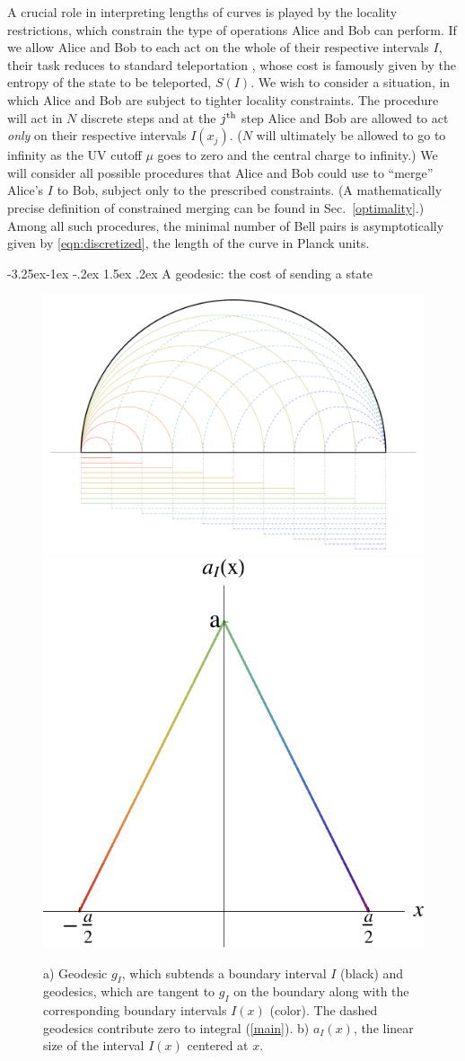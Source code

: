 \documentclass[12pt]{article}
\makeatletter
\renewcommand\subsection{\@startsection{subsection}{2}{\z@}%
                                     {-3.25ex\@plus -1ex \@minus -.2ex}%
                                     {1.5ex \@plus .2ex}%
                                     {\normalfont\bfseries}}
\newcommand{\secref}[1]{Sec.~\ref{#1}}
\makeatother
\begin{document}
A crucial role in interpreting lengths of curves is played by the locality restrictions, which constrain the type of operations Alice and Bob can perform. If we allow Alice and Bob to each act on the whole of their respective intervals $I$, their task reduces to standard teleportation \cite{teleport}, whose cost is famously given by the entropy of the state to be teleported, $S(I)$. We wish to consider a situation, in which Alice and Bob are subject to tighter locality constraints. The procedure will act in $N$ discrete steps and at the $j^{\rm th}$ step Alice and Bob are allowed to act \emph{only} on their respective intervals $I(x_j)$. ($N$ will ultimately be allowed to go to infinity as the UV cutoff $\mu$ goes to zero and the central charge to infinity.)
We will consider all possible procedures that Alice and Bob could use to ``merge'' Alice's $I$ to Bob, subject only to the prescribed constraints. (A mathematically precise definition of constrained merging can be found in \secref{optimality}.) Among all such procedures, the minimal number of Bell pairs  is asymptotically given by \eqref{eqn:discretized}, the length of the curve in Planck units.

\subsection{A geodesic: the cost of sending a state}
\label{explgeodesic}

\begin{figure}[t!]
\centering
{}\includegraphics[width=.5\textwidth]{picgeodesic.pdf}
\includegraphics[width=.35\textwidth]{aforgeodesic.pdf}
\caption{a) Geodesic $g_I$, which subtends a boundary interval $I$ (black) and geodesics, which are tangent to $g_I$ on the boundary along with the corresponding boundary intervals $I(x)$ (color). The dashed geodesics contribute zero to integral (\ref{main}). b) $a_I(x)$, the linear size of the interval $I(x)$ centered at $x$.}
\label{picgeodesic}
\end{figure}
\end{document}
